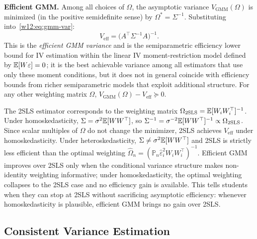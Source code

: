 \documentclass[master.tex]{subfiles}
\begin{document}
\textbf{Efficient GMM.}
Among all choices of $\Omega$, the asymptotic variance
$V_{\mathrm{GMM}}(\Omega)$ is minimized (in the positive
semidefinite sense) by $\Omega^\ast = \Sigma^{-1}$.  Substituting
into~\eqref{w12:eq:gmm-var}:
\begin{equation}
  V_{\mathrm{eff}}
  = \bigl(A^\top\Sigma^{-1}A\bigr)^{-1}.
  \label{w12:eq:eff-var}
\end{equation}
This is the \emph{efficient GMM variance} and is the semiparametric
efficiency lower bound for IV estimation within the linear
IV moment-restriction model defined by $\mathbb{E}[W\varepsilon] = 0$;
it is the best achievable variance among all estimators that use only
these moment conditions, but it does not in general coincide with
efficiency bounds from richer semiparametric models that exploit
additional structure.  For any other weighting matrix $\Omega$,
$V_{\mathrm{GMM}}(\Omega) - V_{\mathrm{eff}} \succeq 0$.

\begin{remark}
The 2SLS estimator corresponds to the weighting matrix
$\Omega_{\mathrm{2SLS}} = \mathbb{E}[W_i W_i^\top]^{-1}$.  Under
homoskedasticity, $\Sigma = \sigma^2\mathbb{E}[WW^\top]$, so
$\Sigma^{-1} = \sigma^{-2}\mathbb{E}[WW^\top]^{-1} \propto \Omega_{\mathrm{2SLS}}$.
Since scalar multiples of $\Omega$ do not change the minimizer,
2SLS achieves $V_{\mathrm{eff}}$ under homoskedasticity.  Under
heteroskedasticity, $\Sigma \neq \sigma^2\mathbb{E}[WW^\top]$ and 2SLS is
strictly less efficient than the optimal weighting
$\hat\Omega_n = (\mathbb{P}_n \hat\varepsilon_i^2 W_i W_i^\top)^{-1}$.
Efficient GMM improves over 2SLS only when the conditional variance
structure makes non-identity weighting informative; under
homoskedasticity, the optimal weighting collapses to the 2SLS case
and no efficiency gain is available.  This tells students when they
can stop at 2SLS without sacrificing asymptotic efficiency: whenever
homoskedasticity is plausible, efficient GMM brings no gain over 2SLS.
\end{remark}

\subsection{Consistent Variance Estimation}
\end{document}
